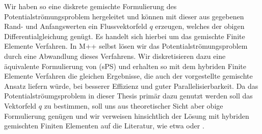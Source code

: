 Wir haben so eine diskrete gemischte Formulierung des Potentialströmungsproblem hergeleitet und können mit dieser aus gegebenen Rand- und Anfangswerten ein Flussvektorfeld $q$ erzeugen, welches der obigen Differentialgleichung genügt.
Es handelt sich hierbei um das gemischte Finite Elemente Verfahren. In M++ selbst lösen wir das Potentialströmungsproblem durch eine Abwandlung dieses Verfahrens. Wir diskretisieren dazu eine äquivalente Formulierung von (sPS) und erhalten so mit dem hybriden Finite Elemente Verfahren die gleichen Ergebnisse, die auch der vorgestellte gemischte Ansatz liefern würde, bei besserer Effizienz und guter Parallelisierbarkeit. Da das Potentialströumgsproblem in dieser Thesis primär dazu genutzt werden soll das Vektorfeld $q$ zu bestimmen, soll uns aus theoretischer Sicht aber obige Formulierung genügen und wir verweisen hinsichtlich der Lösung mit hybriden gemischten Finiten Elementen auf die Literatur, wie etwa \cite{brezzi2012mixed} oder  \cite{roberts1991mixed}.




